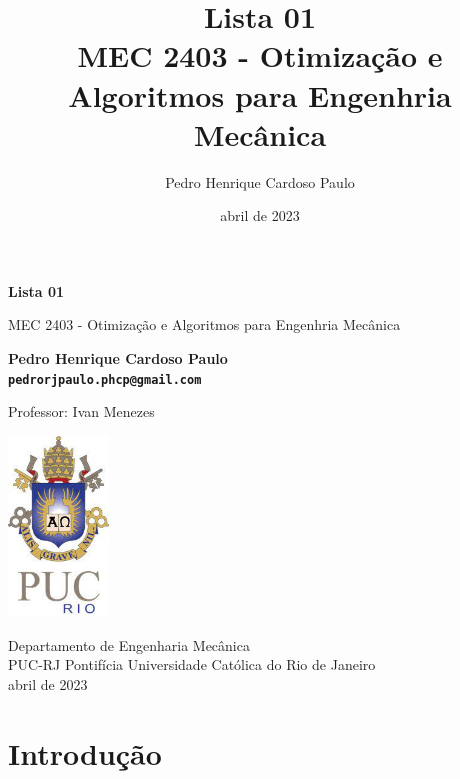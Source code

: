 \documentclass[10pt, a4paper]{article}
\begin{document}
\def\TITLE{Lista 01}
\def\DISCIPLINE{MEC 2403 - Otimização e Algoritmos para Engenhria Mecânica}
\def\PROFESSOR{Ivan Menezes}
\def\AUTHOR{Pedro Henrique Cardoso Paulo}
\def\CONTACT{pedrorjpaulo.phcp@gmail.com}
\def\DATE{abril de 2023}

\title{\textbf{\TITLE} \\ \DISCIPLINE}
\author{\AUTHOR}
\date{\DATE}

\begin{titlepage}
      \begin{center}
          \vspace*{1cm}

          \Huge
          \textbf{\TITLE}

          \vspace{0.5cm}
          \LARGE
          \DISCIPLINE

          \vspace{1.5cm}

          \textbf{\AUTHOR \\ {\tt \CONTACT}}

          \vfill
          Professor: \PROFESSOR

          \vspace{0.8cm}

          \includegraphics[width=0.2\textwidth]{../general/puc.jpg}

          \Large
          Departamento de Engenharia Mecânica\\
          PUC-RJ Pontifícia Universidade Católica do Rio de Janeiro\\
          \DATE

      \end{center}
  \end{titlepage}

\maketitle

\section{Introdução}
\end{document}
